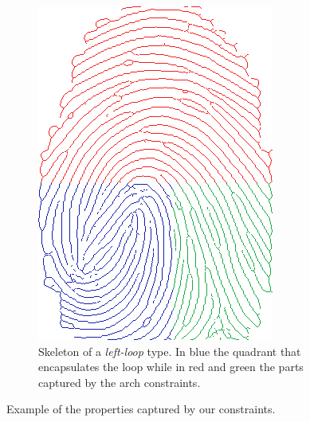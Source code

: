 \documentclass[8pt]{article}
\begin{document}
\begin{figure}
\begin{subfigure}{.48\textwidth}
	\includegraphics[width=0.86\linewidth]{img/loop}
	\caption{Skeleton of a \textit{left-loop} type. In blue the quadrant that encapsulates the loop while in red and green the parts captured by the arch constraints.}
	\label{fig:loop}
\end{subfigure}%
\caption{Example of the properties captured by our constraints.}
\label{fig:example}
\end{figure}











\end{document}
